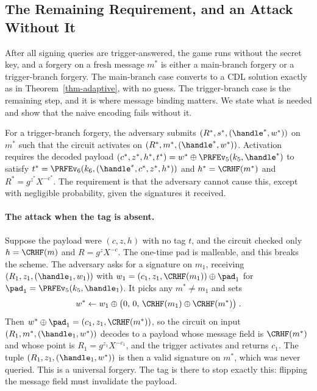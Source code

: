\subsection{The Remaining Requirement, and an Attack Without It} \label{sec-poly-gap}

After all signing queries are trigger-answered, the game runs without the secret key, and a forgery on a fresh message $m^\ast$ is either a main-branch forgery or a trigger-branch forgery. The main-branch case converts to a CDL solution exactly as in Theorem~\ref{thm-adaptive}, with no guess. The trigger-branch case is the remaining step, and it is where message binding matters. We state what is needed and show that the naive encoding fails without it.

For a trigger-branch forgery, the adversary submits $(R^\ast, s^\ast, (\handle^\ast, w^\ast))$ on $m^\ast$ such that the circuit activates on $(R^\ast, m^\ast, (\handle^\ast, w^\ast))$. Activation requires the decoded payload $(c^\ast, z^\ast, h^\ast, t^\ast) = w^\ast \oplus \PRFEv_5(k_5, \handle^\ast)$ to satisfy $t^\ast = \PRFEv_6(k_6, (\handle^\ast, c^\ast, z^\ast, h^\ast))$ and $h^\ast = \CRHF(m^\ast)$ and $R^\ast = g^{z^\ast} X^{-c^\ast}$. The requirement is that the adversary cannot cause this, except with negligible probability, given the signatures it received.

\paragraph*{The attack when the tag is absent.} Suppose the payload were $(c, z, h)$ with no tag $t$, and the circuit checked only $h = \CRHF(m)$ and $R = g^{z} X^{-c}$. The one-time pad is malleable, and this breaks the scheme. The adversary asks for a signature on $m_1$, receiving $(R_1, z_1, (\handle_1, w_1))$ with $w_1 = (c_1, z_1, \CRHF(m_1)) \oplus \pad_1$ for $\pad_1 = \PRFEv_5(k_5, \handle_1)$. It picks any $m^\ast \ne m_1$ and sets
$$w^\ast \gets w_1 \oplus \big(0,\, 0,\, \CRHF(m_1) \oplus \CRHF(m^\ast)\big) \;.$$
Then $w^\ast \oplus \pad_1 = (c_1, z_1, \CRHF(m^\ast))$, so the circuit on input $(R_1, m^\ast, (\handle_1, w^\ast))$ decodes to a payload whose message field is $\CRHF(m^\ast)$ and whose point is $R_1 = g^{z_1} X^{-c_1}$, and the trigger activates and returns $c_1$. The tuple $(R_1, z_1, (\handle_1, w^\ast))$ is then a valid signature on $m^\ast$, which was never queried. This is a universal forgery. The tag is there to stop exactly this: flipping the message field must invalidate the payload.

